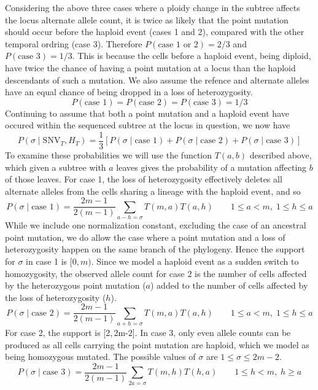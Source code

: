 \documentclass[../../main.tex]{subfiles}
\begin{document}
Considering the above three cases where a ploidy change in the subtree affects the locus alternate allele count, it is twice as likely that the point mutation should occur before the haploid event (cases 1 and 2), compared with the other temporal ordring (case 3). Therefore $P(\text{case 1 or 2})=2/3$ and $P(\text{case 3})=1/3$. This is because the cells before a haploid event, being diploid, have twice the chance of having a point mutation at a locus than the haploid descendants of such a mutation. We also assume the refence and alternate alleles have an equal chance of being dropped in a loss of heterozygosity.
\begin{equation*}
P(\text{case 1})=P(\text{case 2}) = P(\text{case 3}) = 1/3
\end{equation*}
Continuing to assume that both a point mutation and a haploid event have occured within the sequenced subtree at the locus in question, we now have
\begin{equation*}
P(\sigma\mid\text{SNV}_T,H_T)=\frac{1}{3}\left[P(\sigma\mid\text{case 1})+P(\sigma\mid\text{case 2})+P(\sigma\mid\text{case 3})\right]
\end{equation*}
To examine these probabilities we will use the function $T(a,b)$ described above, which given a subtree with $a$ leaves gives the probability of a mutation affecting $b$ of those leaves. For case 1, the loss of heterozygosity effectively deletes all alternate alleles from the cells sharing a lineage with the haploid event, and so
\begin{equation*}
P(\sigma\mid\text{case 1}) = \frac{2m-1}{2(m-1)}\sum_{a-h=\sigma}T(m,a)T(a,h)\qquad 1\leq a < m,\;1\leq h\leq a
\end{equation*}
While we include one normalization constant, excluding the case of an ancestral point mutation, we do allow the case where a point mutation and a loss of heterozygosity happen on the same branch of the phylogeny. Hence the support for $\sigma$ in case 1 is $[0,m)$. Since we model a haploid event as a sudden switch to homozygosity, the observed allele count for case 2 is the number of cells affected by the heterozygous point mutation ($a$) added to the number of cells affected by the loss of heterozygosity ($h$).
\begin{equation*}
P(\sigma\mid\text{case 2}) = \frac{2m-1}{2(m-1)}\sum_{a+h=\sigma}T(m,a)T(a,h) \qquad 1\leq a < m,\;1\leq h\leq a
\end{equation*}
For case 2, the support is [2,\,2m-2]. In case 3, only even allele counts can be produced as all cells carrying the point mutation are haploid, which we model as being homozygous mutated. The possible values of $\sigma$ are $1\leq\sigma\leq 2m-2$.
\begin{equation*}
P(\sigma\mid\text{case 3}) = \frac{2m-1}{2(m-1)}\sum_{2a=\sigma} T(m,h)T(h,a) \qquad 1\leq h < m,\; h\geq a
\end{equation*}
\end{document}

